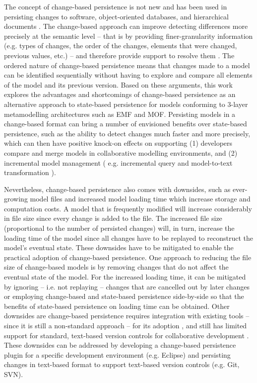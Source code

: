 The concept of change-based persistence is not new and has been used in persisting changes to software, 
object-oriented databases, and hierarchical documents 
\cite{DBLP:journals/entcs/RobbesL07,DBLP:conf/sde/LippeO92,DBLP:conf/caise/IgnatN05}. 
The change-based approach can improve detecting differences more precisely at the semantic 
level -- that is by providing finer-granularity information (e.g. types of changes, the order of the changes, 
elements that were changed, previous values, etc.) -- and therefore provide support to resolve them \cite{mens2002state}. 
The ordered nature of change-based persistence means that changes made to a model can be identified sequentially without 
having to explore and compare all elements of the model and its previous version. Based on these arguments, 
this work explores the advantages and shortcomings of change-based persistence as an alternative approach to 
state-based persistence for models conforming to 3-layer metamodelling architectures such as EMF and MOF. 
Persisting models in a change-based format can bring a number of envisioned benefits over state-based persistence, 
such as the ability to detect changes much faster and more precisely, which can then have positive 
knock-on effects on supporting (1) developers compare and merge models in collaborative modelling environments, 
and (2) incremental model management ( e.g. incremental query \cite{DBLP:conf/ecmdafa/RathHV12} and 
model-to-text transformation \cite{DBLP:conf/ecmdafa/OgunyomiRK15}). 

Nevertheless, change-based persistence also comes with downsides, such as ever-growing model files 
\cite{DBLP:journals/entcs/RobbesL07,DBLP:conf/edoc/KoegelHLHD10} and increased model loading time \cite{mens2002state}
which increase storage and computation costs. A model that is frequently modified will increase considerably in file size 
since every change is added to the file. The increased file size (proportional to the number of persisted changes) will, 
in turn, increase the loading time of the model since all changes have to be replayed to reconstruct the model's 
eventual state. These downsides have to be mitigated to enable the practical adoption of change-based persistence. 
One approach to reducing the file size of change-based models is by removing changes that do not affect the eventual 
state of the model. For the increased loading time, it can be mitigated by ignoring -- i.e. not replaying -- changes 
that are cancelled out by later changes or employing change-based and state-based persistence side-by-side so that the
benefits of state-based persistence on loading time can be obtained. Other downsides are change-based persistence requires 
integration with existing tools -- since it is still a non-standard approach -- for its adoption \cite{koegel2010emfstore}, 
and still has limited support for standard, text-based version controls for collaborative development \cite{koegel2010emfstore}. 
These downsides can be addressed by developing a change-based persistence plugin for a specific development environment 
(e.g. Eclipse) and persisting changes in text-based format to support text-based version controls (e.g. Git, SVN).

